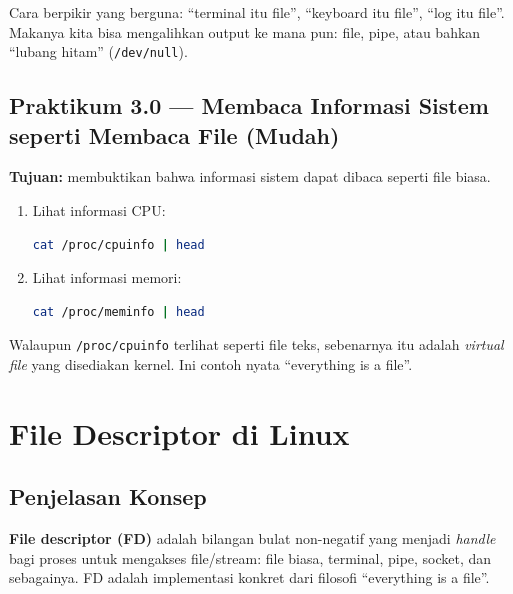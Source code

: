 \begin{tipbox}
Cara berpikir yang berguna: ``terminal itu file'', ``keyboard itu file'', ``log itu file''.
Makanya kita bisa mengalihkan output ke mana pun: file, pipe, atau bahkan ``lubang hitam'' (\texttt{/dev/null}).
\end{tipbox}

\subsection*{Praktikum 3.0 --- Membaca Informasi Sistem seperti Membaca File (Mudah)}
\textbf{Tujuan:} membuktikan bahwa informasi sistem dapat dibaca seperti file biasa.

\begin{enumerate}
    \item Lihat informasi CPU:
\begin{lstlisting}[language=bash, caption={Membaca info CPU dari /proc}]
cat /proc/cpuinfo | head
\end{lstlisting}

    \item Lihat informasi memori:
\begin{lstlisting}[language=bash, caption={Membaca info memori dari /proc}]
cat /proc/meminfo | head
\end{lstlisting}
\end{enumerate}

\begin{examplebox}[Refleksi]
Walaupun \texttt{/proc/cpuinfo} terlihat seperti file teks, sebenarnya itu adalah \textit{virtual file} yang disediakan kernel.
Ini contoh nyata ``everything is a file''.
\end{examplebox}

\section{File Descriptor di Linux}
\label{sec:fd}

\subsection*{Penjelasan Konsep}
\textbf{File descriptor (FD)} adalah bilangan bulat non-negatif yang menjadi \textit{handle} bagi proses untuk mengakses file/stream:
file biasa, terminal, pipe, socket, dan sebagainya.
FD adalah implementasi konkret dari filosofi ``everything is a file''.

